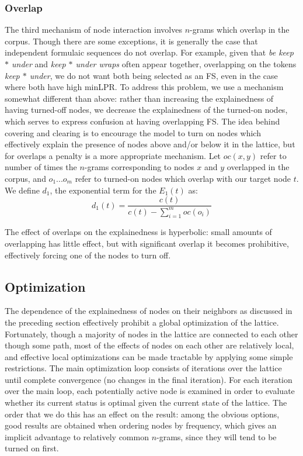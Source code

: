 \documentclass[11pt,letterpaper]{article}
\newcommand{\dotts}{...}
\newcommand{\gap}{$*$\xspace}
\newcommand{\ex}[1]{\textit{#1}\xspace}
\begin{document}
\subsubsection{Overlap}

The third mechanism of node interaction involves $n$-grams which overlap in the corpus. Though there are some exceptions, it is generally the case that independent formulaic sequences do not overlap. For example, given that \ex{be keep \gap under} and \ex{keep \gap under wraps} often appear together, overlapping on the tokens \ex{keep \gap under}, we do not want both being selected as an FS, even in the case where both have high minLPR. To address this problem, we use a mechanism somewhat different than above: rather than increasing the explainedness of having turned-off nodes, we decrease the explainedness of the turned-on nodes, which serves to express confusion at having overlapping FS. The idea behind covering and clearing is to encourage the model to turn on nodes which effectively explain the presence of nodes above and/or below it in the lattice, but for overlaps a penalty is a more appropriate mechanism. Let $oc(x,y)$ refer to number of times the $n$-grams corresponding to nodes $x$ and $y$ overlapped in the corpus, and $o_1\dotts o_m$ refer to turned-on nodes which overlap with our target node $t$. We define $d_1$, the exponential term for the $E_1(t)$ as:
\begin{displaymath}
d_{1}(t) = \frac{c(t)}{c(t) - \sum_{i=1}^{m}{oc(o_i)}}
\end{displaymath}

The effect of overlaps on the explainedness is hyperbolic: small amounts of overlapping has little effect, but with significant overlap it becomes prohibitive, effectively forcing one of the nodes to turn off. 

 
\subsection{Optimization}

The dependence of the explainedness of nodes on their neighbors as discussed in the preceding section effectively prohibit a global optimization of the lattice. Fortunately, though a majority of nodes in the lattice are connected to each other though some path, most of the effects of nodes on each other are relatively local, and effective local optimizations can be made tractable by applying some simple restrictions. The main optimization loop consists of iterations over the lattice until complete convergence (no changes in the final iteration). For each iteration over the main loop, each potentially active node is examined in order to evaluate whether its current status is optimal given the current state of the lattice. The order that we do this has an effect on the result: among the obvious options, good results are obtained when ordering nodes by frequency, which gives an implicit advantage to relatively common $n$-grams, since they will tend to be turned on first.
\end{document}
